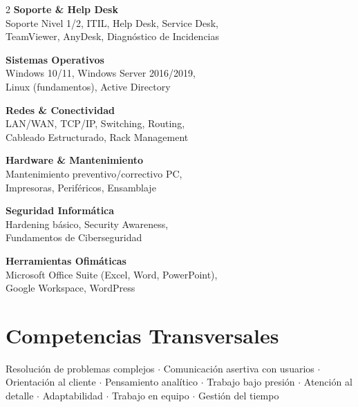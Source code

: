\documentclass[10pt, letterpaper]{article}
\begin{document}
\begin{multicols}{2}
\noindent\textbf{\color{primary}Soporte \& Help Desk}\\
{\small Soporte Nivel 1/2, ITIL, Help Desk, Service Desk,\\
TeamViewer, AnyDesk, Diagnóstico de Incidencias}

\vspace{6pt}
\noindent\textbf{\color{primary}Sistemas Operativos}\\
{\small Windows 10/11, Windows Server 2016/2019,\\
Linux (fundamentos), Active Directory}

\vspace{6pt}
\noindent\textbf{\color{primary}Redes \& Conectividad}\\
{\small LAN/WAN, TCP/IP, Switching, Routing,\\
Cableado Estructurado, Rack Management}

\columnbreak

\noindent\textbf{\color{primary}Hardware \& Mantenimiento}\\
{\small Mantenimiento preventivo/correctivo PC,\\
Impresoras, Periféricos, Ensamblaje}

\vspace{6pt}
\noindent\textbf{\color{primary}Seguridad Informática}\\
{\small Hardening básico, Security Awareness,\\
Fundamentos de Ciberseguridad}

\vspace{6pt}
\noindent\textbf{\color{primary}Herramientas Ofimáticas}\\
{\small Microsoft Office Suite (Excel, Word, PowerPoint),\\
Google Workspace, WordPress}
\end{multicols}

\section{Competencias Transversales}

{\small Resolución de problemas complejos $\cdot$ Comunicación asertiva con usuarios $\cdot$ Orientación al cliente $\cdot$ Pensamiento analítico $\cdot$ Trabajo bajo presión $\cdot$ Atención al detalle $\cdot$ Adaptabilidad $\cdot$ Trabajo en equipo $\cdot$ Gestión del tiempo}

\end{document}
